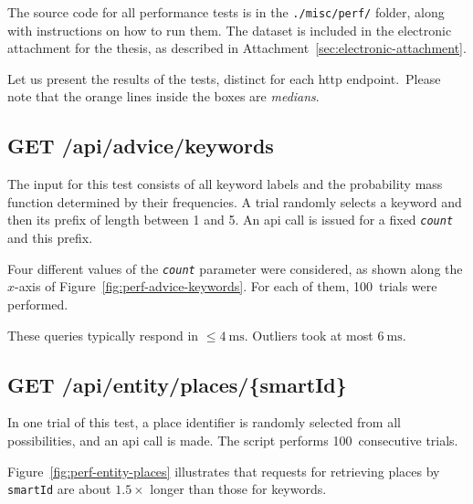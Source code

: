 The source code for all performance tests is in the \texttt{./misc/perf/} folder, along with instructions on how to run them. The dataset is included in the electronic attachment for the thesis, as described in Attachment~\ref{sec:electronic-attachment}.

\newpage

Let us present the results of the tests, distinct for each \acs{http} endpoint.~Please note that the orange lines inside the boxes are \emph{medians}.

\vspace{1.5em}

\subsection*{GET /api/advice/keywords}

The input for this test consists of all keyword labels and the probability mass function determined by their frequencies. A trial randomly selects a keyword and then its prefix of length between 1 and 5. An \acs{api} call is issued for a fixed \texttt{\emph{count}} and this prefix.

Four different values of the \texttt{\emph{count}} parameter were considered, as shown along the $x$-axis of Figure~\ref{fig:perf-advice-keywords}. For each of them, 100~trials were performed.

These queries typically respond in $\leq 4~\text{ms}$. Outliers took at most $6~\text{ms}$.

\vspace{1.5em}

\subsection*{GET /api/entity/places/\{smartId\}}

In one trial of this test, a place identifier is randomly selected from all possibilities, and an \acs{api} call is made. The script performs 100~consecutive trials.

Figure~\ref{fig:perf-entity-places} illustrates that requests for retrieving places by \texttt{smartId} are about $1.5\times$ longer than those for keywords.

\vspace{6.0em}

